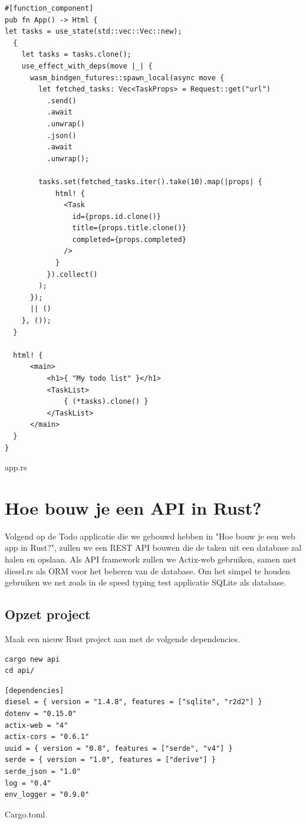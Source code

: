 \begin{listing}
\begin{verbatim}
#[function_component]
pub fn App() -> Html {
let tasks = use_state(std::vec::Vec::new);
  {
    let tasks = tasks.clone();
    use_effect_with_deps(move |_| {
      wasm_bindgen_futures::spawn_local(async move {
        let fetched_tasks: Vec<TaskProps> = Request::get("url")
          .send()
          .await
          .unwrap()
          .json()
          .await
          .unwrap();

        tasks.set(fetched_tasks.iter().take(10).map(|props| {
            html! { 
              <Task 
                id={props.id.clone()} 
                title={props.title.clone()} 
                completed={props.completed} 
              /> 
            }
          }).collect()
        );
      });
      || ()
    }, ());
  }

  html! {
      <main>
          <h1>{ "My todo list" }</h1>
          <TaskList>
              { (*tasks).clone() }
          </TaskList>
      </main>
  }
}
\end{verbatim}
\caption{app.rs}
\end{listing}

\clearpage

\section{Hoe bouw je een API in Rust?}

Volgend op de Todo applicatie die we gebouwd hebben in "Hoe bouw je een web app in Rust?",
zullen we een REST API bouwen die de taken uit een database zal halen en opslaan. Als API framework
zullen we Actix-web gebruiken, samen met diesel.rs als ORM voor het beheren van de database. Om het
simpel te houden gebruiken we net zoals in de speed typing test applicatie SQLite als database.


\subsection{Opzet project}

Maak een nieuw Rust project aan met de volgende dependencies.

\begin{verbatim}
cargo new api
cd api/
\end{verbatim}

\begin{listing}[h]
\begin{verbatim}
[dependencies]
diesel = { version = "1.4.8", features = ["sqlite", "r2d2"] }
dotenv = "0.15.0"
actix-web = "4"
actix-cors = "0.6.1"
uuid = { version = "0.8", features = ["serde", "v4"] }
serde = { version = "1.0", features = ["derive"] }
serde_json = "1.0"
log = "0.4"
env_logger = "0.9.0"
\end{verbatim}
\caption{Cargo.toml}
\end{listing}


